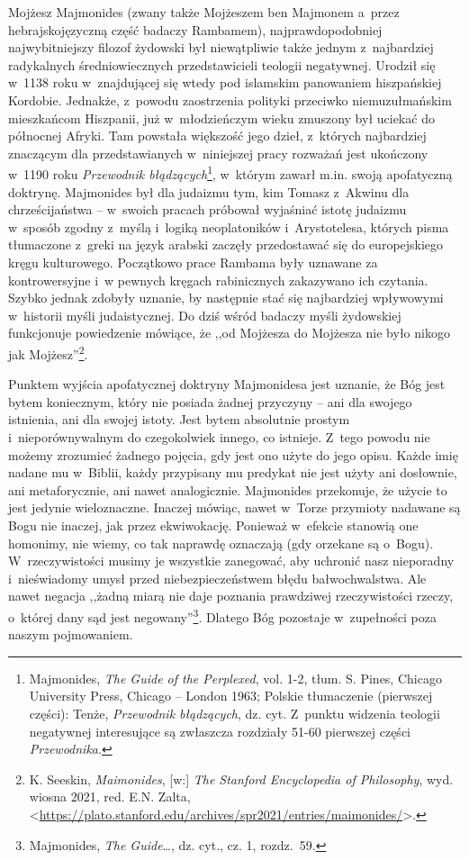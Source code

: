 Mojżesz Majmonides (zwany także Mojżeszem ben Majmonem a~przez hebrajskojęzyczną część badaczy Rambamem), najprawdopodobniej najwybitniejszy filozof żydowski był niewątpliwie także jednym z~najbardziej radykalnych średniowiecznych przedstawicieli teologii negatywnej. Urodził się w~1138 roku w~znajdującej się wtedy pod islamskim panowaniem hiszpańskiej Kordobie. Jednakże, z~powodu zaostrzenia polityki przeciwko niemuzułmańskim mieszkańcom Hiszpanii, już w~młodzieńczym wieku zmuszony był uciekać do północnej Afryki. Tam powstała większość jego dzieł, z~których najbardziej znaczącym dla przedstawianych w~niniejszej pracy rozważań jest ukończony w~1190 roku \textit{Przewodnik błądzących}\footnote{Majmonides, \textit{The Guide of the Perplexed}, vol. 1-2, tłum. S. Pines, Chicago University Press, Chicago -- London 1963; Polskie tłumaczenie (pierwszej części): Tenże, \textit{Przewodnik błądzących}, dz. cyt. Z~punktu widzenia teologii negatywnej interesujące są zwłaszcza rozdziały 51-60 pierwszej części \textit{Przewodnika}.}, w~którym zawarł m.in. swoją apofatyczną doktrynę. Majmonides był dla judaizmu tym, kim Tomasz z~Akwinu dla chrześcijaństwa -- w~swoich pracach próbował wyjaśniać istotę judaizmu w~sposób zgodny z~myślą i~logiką neoplatoników i~Arystotelesa, których pisma tłumaczone z~greki na język arabski zaczęły przedostawać się do europejskiego kręgu kulturowego. Początkowo prace Rambama były uznawane za kontrowersyjne i~w pewnych kręgach rabinicznych zakazywano ich czytania. Szybko jednak zdobyły uznanie, by następnie stać się najbardziej wpływowymi w~historii myśli judaistycznej. Do dziś wśród badaczy myśli żydowskiej funkcjonuje powiedzenie mówiące, że ,,od Mojżesza do Mojżesza nie było nikogo jak Mojżesz''\footnote{K. Seeskin, \textit{Maimonides}, [w:] \textit{The Stanford Encyclopedia of Philosophy}, wyd. wiosna 2021, red. E.N. Zalta, <\url{https://plato.stanford.edu/archives/spr2021/entries/maimonides/}>.}.

Punktem wyjścia apofatycznej doktryny Majmonidesa jest uznanie, że Bóg jest bytem koniecznym, który nie posiada żadnej przyczyny -- ani dla swojego istnienia, ani dla swojej istoty. Jest bytem absolutnie prostym i~nieporównywalnym do czegokolwiek innego, co istnieje. Z~tego powodu nie możemy zrozumieć żadnego pojęcia, gdy jest ono użyte do jego opisu. Każde imię nadane mu w~Biblii, każdy przypisany mu predykat nie jest użyty ani dosłownie, ani metaforycznie, ani nawet analogicznie. Majmonides przekonuje, że użycie to jest jedynie wieloznaczne. Inaczej mówiąc, nawet w~Torze przymioty nadawane są Bogu nie inaczej, jak przez ekwiwokację. Ponieważ w~efekcie stanowią one homonimy, nie wiemy, co tak naprawdę oznaczają (gdy orzekane są o~Bogu). W~rzeczywistości musimy je wszystkie zanegować, aby uchronić nasz nieporadny i~nieświadomy umysł przed niebezpieczeństwem błędu bałwochwalstwa. Ale nawet negacja ,,żadną miarą nie daje poznania prawdziwej rzeczywistości rzeczy, o~której dany sąd jest negowany''\footnote{Majmonides, \textit{The Guide}…, dz. cyt., cz. 1, rozdz.~59.}. Dlatego Bóg pozostaje w~zupełności poza naszym pojmowaniem.

